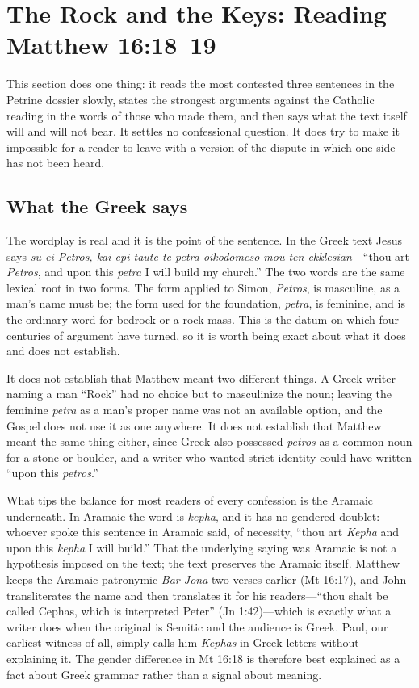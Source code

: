 \section{The Rock and the Keys: Reading Matthew 16:18--19}

This section does one thing: it reads the most contested three sentences in
the Petrine dossier slowly, states the strongest arguments against the
Catholic reading in the words of those who made them, and then says what the
text itself will and will not bear. It settles no confessional question. It
does try to make it impossible for a reader to leave with a version of the
dispute in which one side has not been heard.

\subsection{What the Greek says}

The wordplay is real and it is the point of the sentence. In the Greek text
Jesus says \textit{su ei Petros, kai epi taute te petra oikodomeso mou ten
ekklesian}---``thou art \textit{Petros}, and upon this \textit{petra} I will
build my church.'' The two words are the same lexical root in two forms. The
form applied to Simon, \textit{Petros}, is masculine, as a man's name must
be; the form used for the foundation, \textit{petra}, is feminine, and is the
ordinary word for bedrock or a rock mass. This is the datum on which four
centuries of argument have turned, so it is worth being exact about what it
does and does not establish.

It does not establish that Matthew meant two different things. A Greek writer
naming a man ``Rock'' had no choice but to masculinize the noun; leaving the
feminine \textit{petra} as a man's proper name was not an available option,
and the Gospel does not use it as one anywhere. It does not establish that
Matthew meant the same thing either, since Greek also possessed
\textit{petros} as a common noun for a stone or boulder, and a writer who
wanted strict identity could have written ``upon this \textit{petros}.''

What tips the balance for most readers of every confession is the Aramaic
underneath. In Aramaic the word is \textit{kepha}, and it has no gendered
doublet: whoever spoke this sentence in Aramaic said, of necessity, ``thou
art \textit{Kepha} and upon this \textit{kepha} I will build.'' That the
underlying saying was Aramaic is not a hypothesis imposed on the text; the
text preserves the Aramaic itself. Matthew keeps the Aramaic patronymic
\textit{Bar-Jona} two verses earlier (Mt 16:17), and John transliterates the
name and then translates it for his readers---``thou shalt be called Cephas,
which is interpreted Peter'' (Jn 1:42)---which is exactly what a writer does
when the original is Semitic and the audience is Greek. Paul, our earliest
witness of all, simply calls him \textit{Kephas} in Greek letters without
explaining it. The gender difference in Mt 16:18 is therefore best explained
as a fact about Greek grammar rather than a signal about meaning.

